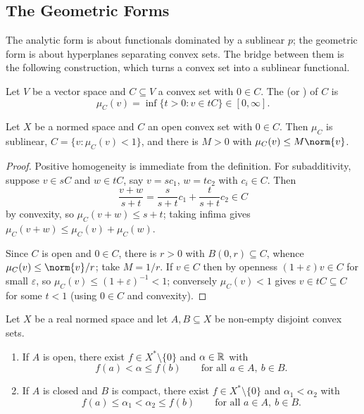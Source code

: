 \documentclass[a4paper]{scrartcl}
\begin{document}
\subsection{The Geometric Forms}

The analytic form is about functionals dominated by a sublinear $p$; the geometric form is about hyperplanes separating convex sets. The bridge between them is the following construction, which turns a convex set into a sublinear functional.

\begin{definition}
	Let $V$ be a vector space and $C \subseteq V$ a convex set with $0 \in C$. The  (or ) of $C$ is
	$$\mu_C(v) = \inf \{ t > 0 : v \in tC \} \in [0, \infty].$$
\end{definition}

\begin{lemma}
	Let $X$ be a normed space and $C$ an open convex set with $0 \in C$. Then $\mu_C$ is sublinear, $C = \{v : \mu_C(v) < 1\}$, and there is $M > 0$ with $\mu_C(v) \leq M \norm{v}$.
\end{lemma}

\begin{proof}
	Positive homogeneity is immediate from the definition. For subadditivity, suppose $v \in sC$ and $w \in tC$, say $v = sc_1$, $w = tc_2$ with $c_i \in C$. Then
	$$\frac{v+w}{s+t} = \frac{s}{s+t}c_1 + \frac{t}{s+t}c_2 \in C$$
	by convexity, so $\mu_C(v+w) \leq s + t$; taking infima gives $\mu_C(v+w) \leq \mu_C(v) + \mu_C(w)$.

	Since $C$ is open and $0 \in C$, there is $r > 0$ with $B(0,r) \subseteq C$, whence $\mu_C(v) \leq \norm{v}/r$; take $M = 1/r$. If $v \in C$ then by openness $(1+\varepsilon)v \in C$ for small $\varepsilon$, so $\mu_C(v) \leq (1+\varepsilon)^{-1} < 1$; conversely $\mu_C(v) < 1$ gives $v \in tC \subseteq C$ for some $t < 1$ (using $0 \in C$ and convexity).
\end{proof}

\begin{theorem}
	Let $X$ be a real normed space and let $A, B \subseteq X$ be non-empty disjoint convex sets.
	\begin{enumerate}[label=(\roman*)]
		\item If $A$ is open, there exist $f \in X^* \setminus \{0\}$ and $\alpha \in \mathbb{R}$ with
		$$f(a) < \alpha \leq f(b) \qquad \text{for all } a \in A, \ b \in B.$$
		\item If $A$ is closed and $B$ is compact, there exist $f \in X^*\setminus\{0\}$ and $\alpha_1 < \alpha_2$ with
		$$f(a) \leq \alpha_1 < \alpha_2 \leq f(b) \qquad \text{for all } a \in A, \ b \in B.$$
	\end{enumerate}
\end{theorem}
\end{document}
